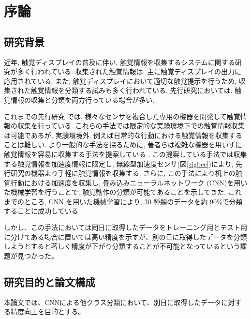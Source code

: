 ﻿

\chapter{序論} \label{sec:intro}
\section{研究背景}
近年, 触覚ディスプレイの普及に伴い, 触覚情報を収集するシステムに関する研究が多く行われている\cite{c3_}. 収集された触覚情報は, 主に触覚ディスプレイの出力に応用されている. 
また, 触覚ディスプレイにおいて適切な触覚提示を行うため, 収集された触覚情報を分類する試みも多く行われている. 先行研究においては, 触覚情報の収集と分類を両方行っている場合が多い. 

これまでの先行研究 \cite{c1} \cite{c2} では, 様々なセンサを複合した専用の機器を開発して触覚情報の収集を行っている. これらの手法では限定的な実験環境下での触覚情報収集は可能であるが, 実験環境外, 例えば日常的な行動における触覚情報を収集することは難しい.  
より一般的な手法を探るために, 著者らは複雑な機器を用いずに触覚情報を容易に収集する手法を提案している \cite{c3}\cite{c4_}.
この提案している手法では収集する触覚情報を加速度情報に限定し, 無線型加速度センサ\cite{c5}(図\ref{zigbee})により, 先行研究の機器より手軽に触覚情報を収集する. 
さらに, この手法により机上の触覚行動における加速度を収集し, 畳み込みニューラルネットワーク (CNN)を用いた機械学習を行うことで, 触覚動作の分類が可能であることを示してきた. これまでのところ, CNN を用いた機械学習により, 30 種類のデータを約 90\%で分類することに成功している. 

しかし、この手法においては同日に取得したデータをトレーニング用とテスト用に分けてある場合に置いては高い精度を示すが、別の日に取得したデータを分類しようとすると著しく精度が下がり分類することが不可能となっているという課題が見つかった。


\section{研究目的と論文構成}
本論文では、CNNによる他クラス分類において、別日に取得したデータに対する精度向上を目的とする。




